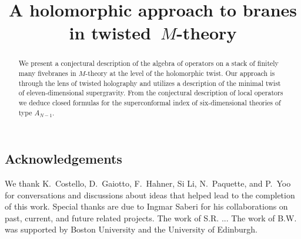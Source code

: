 \documentclass[11pt]{amsart}
\begin{document}
\title{A holomorphic approach to branes in twisted~$M$-theory}
\maketitle

\begin{abstract}
We present a conjectural description of the algebra of operators on a stack of finitely many fivebranes in $M$-theory at the level of the holomorphic twist.
Our approach is through the lens of twisted holography and utilizes a description of the minimal twist of eleven-dimensional supergravity. 
From the conjectural description of local operators we deduce closed formulas for the superconformal index of six-dimensional theories of type $A_{N-1}$.
\end{abstract}

\setcounter{tocdepth}{1}
\tableofcontents



\subsection*{Acknowledgements}
We thank K.~Costello, D.~Gaiotto, F.~Hahner, Si Li, N.~Paquette, and P.~Yoo for conversations and discussions about ideas that helped lead to the completion of this work. 
Special thanks are due to Ingmar Saberi for his collaborations on past, current, and future related projects.
The work of S.R. ...
The work of B.W. was supported by Boston University and the University of Edinburgh. 








 




\printbibliography
\end{document}
